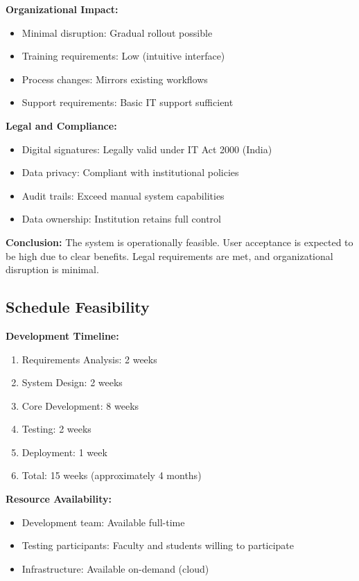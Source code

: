 \textbf{Organizational Impact:}
\begin{itemize}
\item Minimal disruption: Gradual rollout possible
\item Training requirements: Low (intuitive interface)
\item Process changes: Mirrors existing workflows
\item Support requirements: Basic IT support sufficient
\end{itemize}

\textbf{Legal and Compliance:}
\begin{itemize}
\item Digital signatures: Legally valid under IT Act 2000 (India)
\item Data privacy: Compliant with institutional policies
\item Audit trails: Exceed manual system capabilities
\item Data ownership: Institution retains full control
\end{itemize}

\textbf{Conclusion:} The system is operationally feasible. User acceptance is expected to be high due to clear benefits. Legal requirements are met, and organizational disruption is minimal.

\subsection{Schedule Feasibility}

\textbf{Development Timeline:}
\begin{enumerate}
\item Requirements Analysis: 2 weeks
\item System Design: 2 weeks
\item Core Development: 8 weeks
\item Testing: 2 weeks
\item Deployment: 1 week
\item Total: 15 weeks (approximately 4 months)
\end{enumerate}

\textbf{Resource Availability:}
\begin{itemize}
\item Development team: Available full-time
\item Testing participants: Faculty and students willing to participate
\item Infrastructure: Available on-demand (cloud)
\end{itemize}

